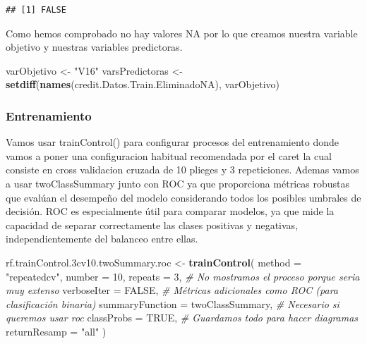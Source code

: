 \documentclass[
]{article}
\newenvironment{Shaded}{\begin{snugshade}}{\end{snugshade}}
\newcommand{\AttributeTok}[1]{\textcolor[rgb]{0.13,0.29,0.53}{#1}}
\newcommand{\CommentTok}[1]{\textcolor[rgb]{0.56,0.35,0.01}{\textit{#1}}}
\newcommand{\ConstantTok}[1]{\textcolor[rgb]{0.56,0.35,0.01}{#1}}
\newcommand{\DecValTok}[1]{\textcolor[rgb]{0.00,0.00,0.81}{#1}}
\newcommand{\FloatTok}[1]{\textcolor[rgb]{0.00,0.00,0.81}{#1}}
\newcommand{\FunctionTok}[1]{\textcolor[rgb]{0.13,0.29,0.53}{\textbf{#1}}}
\newcommand{\NormalTok}[1]{#1}
\newcommand{\OtherTok}[1]{\textcolor[rgb]{0.56,0.35,0.01}{#1}}
\newcommand{\StringTok}[1]{\textcolor[rgb]{0.31,0.60,0.02}{#1}}
\begin{document}
\begin{verbatim}
## [1] FALSE
\end{verbatim}

Como hemos comprobado no hay valores NA por lo que creamos nuestra
variable objetivo y nuestras variables predictoras.

\begin{Shaded}
\begin{Highlighting}[]
\NormalTok{varObjetivo }\OtherTok{\textless{}{-}} \StringTok{"V16"}
\NormalTok{varsPredictoras }\OtherTok{\textless{}{-}} \FunctionTok{setdiff}\NormalTok{(}\FunctionTok{names}\NormalTok{(credit.Datos.Train.EliminadoNA), varObjetivo)}
\end{Highlighting}
\end{Shaded}

\hypertarget{entrenamiento}{%
\subsubsection{Entrenamiento}\label{entrenamiento}}

Vamos usar trainControl() para configurar procesos del entrenamiento
donde vamos a poner una configuracion habitual recomendada por el caret
la cual consiste en cross validacion cruzada de 10 plieges y 3
repeticiones. Ademas vamos a usar twoClassSummary junto con ROC ya que
proporciona métricas robustas que evalúan el desempeño del modelo
considerando todos los posibles umbrales de decisión. ROC es
especialmente útil para comparar modelos, ya que mide la capacidad de
separar correctamente las clases positivas y negativas,
independientemente del balanceo entre ellas.

\begin{Shaded}
\begin{Highlighting}[]
\NormalTok{rf.trainControl}\FloatTok{.3}\NormalTok{cv10.twoSummary.roc }\OtherTok{\textless{}{-}} \FunctionTok{trainControl}\NormalTok{(}
  \AttributeTok{method =} \StringTok{"repeatedcv"}\NormalTok{,}
  \AttributeTok{number =} \DecValTok{10}\NormalTok{,}
  \AttributeTok{repeats =} \DecValTok{3}\NormalTok{,}
  \CommentTok{\# No mostramos el proceso porque seria muy extenso}
  \AttributeTok{verboseIter =} \ConstantTok{FALSE}\NormalTok{,}
  \CommentTok{\# Métricas adicionales como ROC (para clasificación binaria)}
  \AttributeTok{summaryFunction =}\NormalTok{ twoClassSummary,}
  \CommentTok{\# Necesario si queremos usar roc}
  \AttributeTok{classProbs =} \ConstantTok{TRUE}\NormalTok{,}
  \CommentTok{\# Guardamos todo para hacer diagramas}
  \AttributeTok{returnResamp =} \StringTok{"all"}
\NormalTok{)}
\end{Highlighting}
\end{Shaded}
\end{document}
